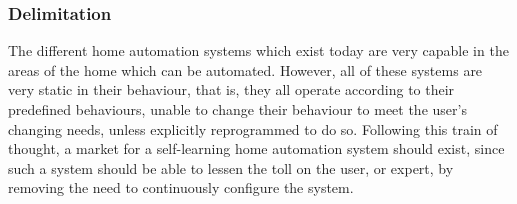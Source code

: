 \subsubsection{Delimitation}
The different home automation systems which exist today are very capable in the areas of the home which can be automated. However, all of these systems are very static in their behaviour, that is, they all operate according to their predefined behaviours, unable to change their behaviour to meet the user's changing needs, unless explicitly reprogrammed to do so. Following this train of thought, a market for a self-learning home automation system should exist, since such a system should be able to lessen the toll on the user, or expert, by removing the need to continuously configure the system.
